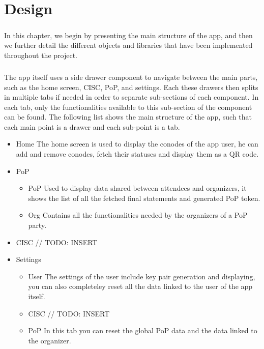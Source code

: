 \chapter{Design}
\paragraph{}
In this chapter, we begin by presenting the main structure of the app, and then we further detail the different objects and libraries that have been implemented throughout the project.

\paragraph{}
The app itself uses a side drawer component to navigate between the main parts, such as the home screen, CISC, PoP, and settings. Each these drawers then splits in multiple tabs if needed in order to separate sub-sections of each component. In each tab, only the functionalities available to this sub-section of the component can be found. The following list shows the main structure of the app, such that each main point is a drawer and each sub-point is a tab.

\begin{itemize}
\item Home \linebreak The home screen is used to display the conodes of the app user, he can add and remove conodes, fetch their statuses and display them as a QR code.

\item PoP
\begin{itemize}
\item PoP \linebreak Used to display data shared between attendees and organizers, it shows the list of all the fetched final statements and generated PoP token.

\item Org \linebreak Contains all the functionalities needed by the organizers of a PoP party.
\end{itemize}

\item CISC // TODO: INSERT

\item Settings
\begin{itemize}
\item User \linebreak The settings of the user include key pair generation and displaying, you can also completeley reset all the data linked to the user of the app itself.

\item CISC // TODO: INSERT

\item PoP \linebreak In this tab you can reset the global PoP data and the data linked to the organizer.
\end{itemize}
\end{itemize}

